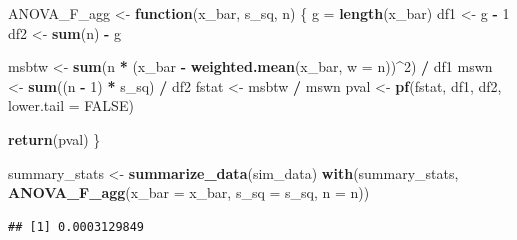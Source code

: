 \documentclass[
]{book}
\newenvironment{Shaded}{\begin{snugshade}}{\end{snugshade}}
\newcommand{\AttributeTok}[1]{\textcolor[rgb]{0.13,0.29,0.53}{#1}}
\newcommand{\ConstantTok}[1]{\textcolor[rgb]{0.56,0.35,0.01}{#1}}
\newcommand{\ControlFlowTok}[1]{\textcolor[rgb]{0.13,0.29,0.53}{\textbf{#1}}}
\newcommand{\DecValTok}[1]{\textcolor[rgb]{0.00,0.00,0.81}{#1}}
\newcommand{\FunctionTok}[1]{\textcolor[rgb]{0.13,0.29,0.53}{\textbf{#1}}}
\newcommand{\NormalTok}[1]{#1}
\newcommand{\OtherTok}[1]{\textcolor[rgb]{0.56,0.35,0.01}{#1}}
\newcommand{\SpecialCharTok}[1]{\textcolor[rgb]{0.81,0.36,0.00}{\textbf{#1}}}
\begin{document}
\begin{Shaded}
\begin{Highlighting}[]
\NormalTok{ANOVA\_F\_agg }\OtherTok{\textless{}{-}} \ControlFlowTok{function}\NormalTok{(x\_bar, s\_sq, n) \{}
\NormalTok{  g }\OtherTok{=} \FunctionTok{length}\NormalTok{(x\_bar)}
\NormalTok{  df1 }\OtherTok{\textless{}{-}}\NormalTok{ g }\SpecialCharTok{{-}} \DecValTok{1}
\NormalTok{  df2 }\OtherTok{\textless{}{-}} \FunctionTok{sum}\NormalTok{(n) }\SpecialCharTok{{-}}\NormalTok{ g}
  
\NormalTok{  msbtw }\OtherTok{\textless{}{-}} \FunctionTok{sum}\NormalTok{(n }\SpecialCharTok{*}\NormalTok{ (x\_bar }\SpecialCharTok{{-}} \FunctionTok{weighted.mean}\NormalTok{(x\_bar, }\AttributeTok{w =}\NormalTok{ n))}\SpecialCharTok{\^{}}\DecValTok{2}\NormalTok{) }\SpecialCharTok{/}\NormalTok{ df1}
\NormalTok{  mswn }\OtherTok{\textless{}{-}} \FunctionTok{sum}\NormalTok{((n }\SpecialCharTok{{-}} \DecValTok{1}\NormalTok{) }\SpecialCharTok{*}\NormalTok{ s\_sq) }\SpecialCharTok{/}\NormalTok{ df2}
\NormalTok{  fstat }\OtherTok{\textless{}{-}}\NormalTok{ msbtw }\SpecialCharTok{/}\NormalTok{ mswn}
\NormalTok{  pval }\OtherTok{\textless{}{-}} \FunctionTok{pf}\NormalTok{(fstat, df1, df2, }\AttributeTok{lower.tail =} \ConstantTok{FALSE}\NormalTok{)}
 
  \FunctionTok{return}\NormalTok{(pval)}
\NormalTok{\}}

\NormalTok{summary\_stats }\OtherTok{\textless{}{-}} \FunctionTok{summarize\_data}\NormalTok{(sim\_data)}
\FunctionTok{with}\NormalTok{(summary\_stats, }\FunctionTok{ANOVA\_F\_agg}\NormalTok{(}\AttributeTok{x\_bar =}\NormalTok{ x\_bar, }\AttributeTok{s\_sq =}\NormalTok{ s\_sq, }\AttributeTok{n =}\NormalTok{ n))}
\end{Highlighting}
\end{Shaded}

\begin{verbatim}
## [1] 0.0003129849
\end{verbatim}
\end{document}
